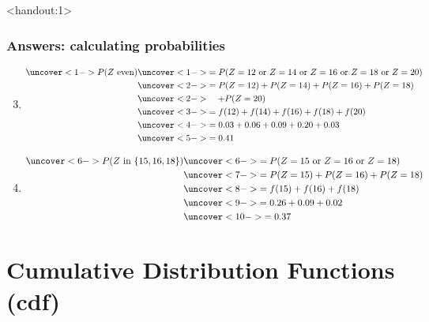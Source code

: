 \documentclass[handout]{beamer}\usepackage[]{graphicx}\usepackage[]{color}
\newcommand{\answers}{1}
\numberwithin{equation}{section}
\begin{document}
\begin{frame}<handout:\answers>
\frametitle{Answers: calculating probabilities} \scriptsize
\begin{enumerate}
\setcounter{enumi}{2}
\item 
\begin{align*}
\uncover<1->{P(Z \text{ even})} & \uncover<1->{= P(Z = 12 \text{ or } Z = 14 \text{ or } Z = 16 \text{ or } Z = 18 \text{ or } Z = 20)} \\
& \uncover<2->{=  P(Z = 12) +  P(Z = 14) +  P(Z = 16) +  P(Z = 18)} \\
 & \uncover<2->{\quad +   P(Z = 20)} \\
&\uncover<3->{ = f(12) + f(14) + f(16) + f(18) + f(20)} \\
& \uncover<4->{= 0.03 + 0.06 + 0.09 + 0.20 + 0.03} \\
& \uncover<5->{= 0.41}
\end{align*}

\item 
\begin{align*}
\uncover<6->{P(Z \text{ in } \{15, 16, 18\})} & \uncover<6->{= P(Z = 15 \text{ or } Z = 16 \text{ or } Z = 18)} \\
&\uncover<7->{ = P(Z = 15) + P(Z = 16) + P(Z = 18)} \\
&\uncover<8->{ = f(15) + f(16) + f(18)} \\
&\uncover<9->{ = 0.26 + 0.09 + 0.02 }\\
&\uncover<10->{ = 0.37}
\end{align*}
\end{enumerate}
\end{frame}










\section{Cumulative Distribution Functions (cdf)}
\end{document}
